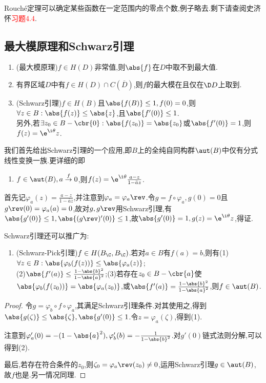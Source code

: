 \documentclass{article}
\newcommand{\exerfunc}[1]{剩下请查阅史济怀\textcolor{red}{习题#1}.}
\begin{document}
Rouch\'e定理可以确定某些函数在一定范围内的零点个数,例子略去.\exerfunc{4.4}

\dayhrule

\subsection{最大模原理和Schwarz引理}
\begin{enumerate}
    \item (最大模原理)$f\in H(D)$非常值,则$\abs{f}$在$D$中取不到最大值.
    \item 有界区域$D$中有$f\in H(D)\cap C(\overline{D})$,则$f$的最大模在且仅在$\D D$上取到.
    \item (Schwarz引理)$f\in H(B)$且$\abs{f(B)}\leq 1, f(0)=0$,则$\forall z\in B:\abs{f(z)}\leq \abs{z}$,且$\abs{f'(0)}\leq 1$.\\
    另外,若$\exists z_0\in B-\cbr{0}:\abs{f(z_0)}=\abs{z_0}$或$\abs{f'(0)}=1$,则$f(z)=\e^{\i\theta}z$.\\
\end{enumerate}

我们首先给出Schwarz引理的一个应用,即$B$上的全纯自同构群$\aut(B)$中仅有分式线性变换一族.更详细的即\begin{enumerate}[resume]
    \item $f\in \aut(B),a\stackrel{f}{\to}0$,则$f(z)=\e^{\i\theta}\frac{a-z}{1-\bar{a}z}$.
\end{enumerate}

首先记$\varphi_a(z)=\frac{a-z}{1-\bar{a}z}$,并注意到$\varphi_a=\varphi_a\rev$.令$g=f\circ\varphi_a, g(0)=0$且$g\rev(0)=\varphi_a(a)=0$,故对$g,g\rev$用Schwarz引理,有$\abs{g'(0)}\leq 1,\abs{(g\rev)'(0)}\leq 1$,故$\abs{g'(0)}=1,g(z)=\e^{\i\theta}z$,得证.

Schwarz引理还可以推广为:
\begin{enumerate}[resume]
    \item (Schwarz-Pick引理)$f\in H(B_\C,B_\C)$.若对$a\in B$有$f(a)=b$,则有(1)$\forall z\in B:\abs{\varphi_b(f(z))}\leq\abs{\varphi_a(z)}$;\\
    (2)$\abs{f'(a)}\leq\frac{1-\abs{b}^2}{1-\abs{a}^2}$;(3)若存在$z_0\in B-\cbr{a}$使$\abs{\varphi_b(f(z_0))}=\abs{\varphi_a(z_0)}$,或$\abs{f'(a)}=\frac{1-\abs{b}^2}{1-\abs{a}^2}$,则$f\in \aut(B)$.
\end{enumerate}
\begin{proof}
    令$g=\varphi_b\circ f\circ\varphi_a$,其满足Schwarz引理条件.对其使用之,得到$\abs{g(\zeta)}\leq\abs{\zeta},\abs{g'(0)}\leq 1$.令$z=\varphi_a(\zeta)$,得到(1).

    注意到$\varphi_a'(0)=-(1-\abs{a}^2),\varphi_b'(b)=-\frac{1}{1-\abs{b}^2}$.对$g'(0)$链式法则分解,可以得到(2).

    最后,若存在符合条件的$z_0$,则$\zeta_0=\varphi_a\rev(z_0)\neq 0$,运用Schwarz引理$g\in \aut(B)$,故$f$也是.另一情况同理.
\end{proof}
\end{document}

